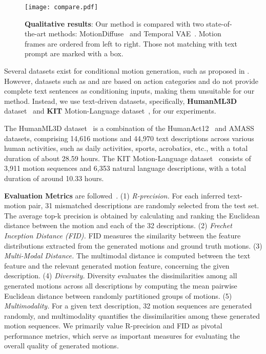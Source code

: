 \documentclass[10pt,twocolumn,letterpaper]{article}
\begin{document}
\begin{figure*}[t]
    \centering
     \texttt{[image: compare.pdf]}
    \caption{\textbf{Qualitative results}: Our method is compared with two state-of-the-art methods: MotionDiffuse~\cite{zhang2022motiondiffuse} and Temporal VAE~\cite{guo2022generating}. Motion frames are ordered from left to right. Those not matching with text prompt are marked with a box.}
    \label{fig:compare}
\end{figure*}




Several datasets exist for conditional motion generation, such as proposed in \cite{guo2022generating,guo2020action2motion,ji2018large,plappert2016kit}. However, datasets such as \cite{guo2020action2motion} and \cite{ji2018large} are based on action categories and do not provide complete text sentences as conditioning inputs, making them unsuitable for our method. Instead, we use text-driven datasets, 
specifically, \textbf{HumanML3D} dataset~\cite{guo2022generating} and \textbf{KIT} Motion-Language dataset~\cite{plappert2016kit}, for our experiments.


The HumanML3D dataset~\cite{guo2022generating} is a combination of the HumanAct12~\cite{guo2020action2motion} and AMASS~\cite{mahmood2019amass} datasets, comprising 14,616 motions and 44,970 text descriptions across various human activities, such as daily activities, sports, acrobatics, etc., with a total duration of about 28.59 hours. The KIT Motion-Language dataset~\cite{plappert2016kit} consists of 3,911 motion sequences and 6,353 natural language descriptions, with a total duration of around 10.33 hours.


\textbf{Evaluation Metrics} are followed~\cite{guo2022generating}. (1) \textit{R-precision.} For each inferred text-motion pair, 31 mismatched descriptions are randomly selected from the test set. The average top-k precision is obtained by calculating and ranking the Euclidean distance between the motion and each of the 32 descriptions. (2) \textit{Frechet Inception Distance (FID).} FID measures the similarity between the feature distributions extracted from the generated motions and ground truth motions. (3) \textit{Multi-Modal Distance.} The multimodal distance is computed between the text feature and the relevant generated motion feature, concerning the given description. (4) \textit{Diversity.} Diversity evaluates the dissimilarities among all generated motions across all descriptions by computing the mean pairwise Euclidean distance between randomly partitioned groups of motions. (5) \textit{Multimodality.} For a given text description, 32 motion sequences are generated randomly, and multimodality quantifies the dissimilarities among these generated motion sequences. We primarily value R-precision and FID as pivotal performance metrics, which serve as important measures for evaluating the overall quality of generated motions.
\end{document}
